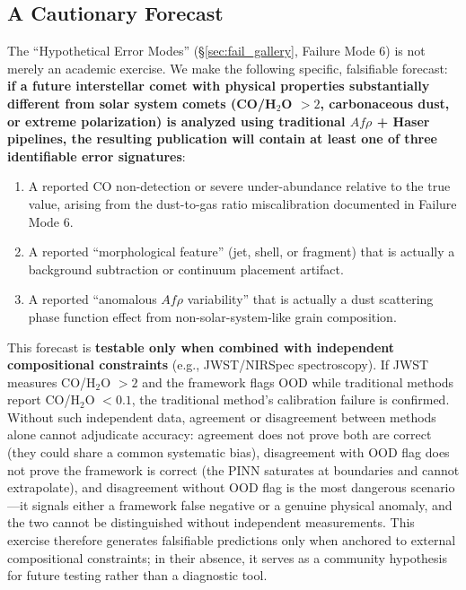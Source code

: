\documentclass[usenatbib]{mnras}
\begin{document}
\subsection{A Cautionary Forecast}

The ``Hypothetical Error Modes'' (\S\ref{sec:fail_gallery}, Failure Mode 6) is not merely an academic exercise. We make the following specific, falsifiable forecast: \textbf{if a future interstellar comet with physical properties substantially different from solar system comets (CO/H$_2$O $> 2$, carbonaceous dust, or extreme polarization) is analyzed using traditional $Af\rho$ + Haser pipelines, the resulting publication will contain at least one of three identifiable error signatures}:

\begin{enumerate}
    \item A reported CO non-detection or severe under-abundance relative to the true value, arising from the dust-to-gas ratio miscalibration documented in Failure Mode 6.
    \item A reported ``morphological feature'' (jet, shell, or fragment) that is actually a background subtraction or continuum placement artifact.
    \item A reported ``anomalous $Af\rho$ variability'' that is actually a dust scattering phase function effect from non-solar-system-like grain composition.
\end{enumerate}

This forecast is \textbf{testable only when combined with independent compositional constraints} (e.g., JWST/NIRSpec spectroscopy). If JWST measures CO/H$_2$O $> 2$ and the framework flags OOD while traditional methods report CO/H$_2$O $< 0.1$, the traditional method's calibration failure is confirmed. Without such independent data, agreement or disagreement between methods alone cannot adjudicate accuracy: agreement does not prove both are correct (they could share a common systematic bias), disagreement with OOD flag does not prove the framework is correct (the PINN saturates at boundaries and cannot extrapolate), and disagreement without OOD flag is the most dangerous scenario---it signals either a framework false negative or a genuine physical anomaly, and the two cannot be distinguished without independent measurements. This exercise therefore generates falsifiable predictions only when anchored to external compositional constraints; in their absence, it serves as a community hypothesis for future testing rather than a diagnostic tool.
\end{document}
